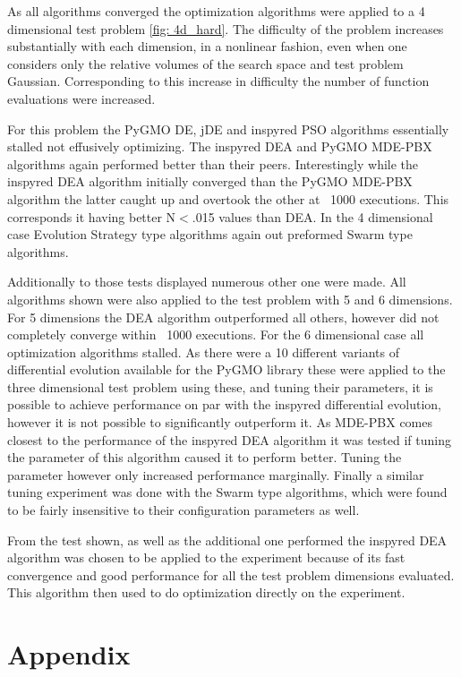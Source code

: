 \documentclass[a4paper,titlepage]{report}
\begin{document}
As all algorithms converged the optimization algorithms were applied to a 4 dimensional test problem \ref{fig: 4d_hard}. The difficulty of the problem increases substantially with each dimension, in a nonlinear fashion, even when one considers only the relative volumes of the search space and test problem Gaussian. Corresponding to this increase in difficulty the number of function evaluations were increased.

For this problem the PyGMO DE, jDE and inspyred PSO algorithms essentially stalled not effusively optimizing. The inspyred DEA and PyGMO MDE-PBX algorithms again performed better than their peers. Interestingly while the inspyred DEA algorithm initially converged than the PyGMO MDE-PBX algorithm the latter caught up and overtook the other at ~1000 executions. This corresponds it having better N$<$.015 values than DEA. In the 4 dimensional case Evolution Strategy type algorithms again out preformed Swarm type algorithms.

Additionally to those tests displayed numerous other one were made. All algorithms shown were also applied to the test problem with 5 and 6 dimensions. For 5 dimensions the DEA algorithm outperformed all others, however did not completely converge within ~1000 executions. For the 6 dimensional case all optimization algorithms stalled. As there were a 10 different variants of differential evolution available for the PyGMO library these were applied to the three dimensional test problem using these, and tuning their parameters, it is possible to achieve performance on par with the inspyred differential evolution, however it is not possible to significantly outperform it. As MDE-PBX comes closest to the performance of the inspyred DEA algorithm it was tested if tuning the parameter of this algorithm caused it to perform better. Tuning the parameter however only increased performance marginally. Finally a similar tuning experiment was done with the Swarm type algorithms, which were found to be fairly insensitive to their configuration parameters as well.

From the test shown, as well as the additional one performed the inspyred DEA algorithm was chosen to be applied to the experiment because of its fast convergence and good performance for all the test problem dimensions evaluated. This algorithm then used to do optimization directly on the experiment.

\chapter{Appendix}
\end{document}
